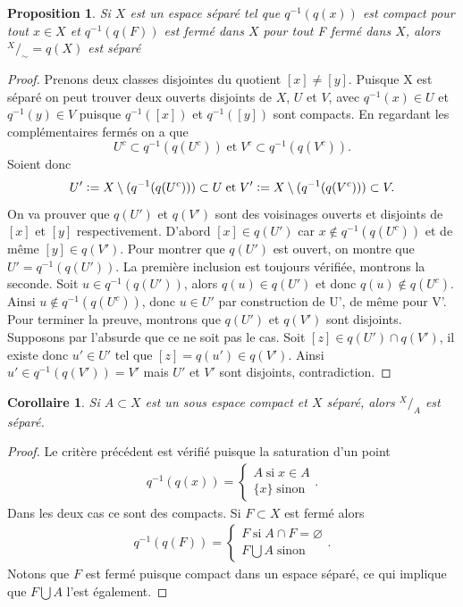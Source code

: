 \documentclass[12pt]{book}
\newcommand{\defeq}{\vcentcolon=}
\newtheorem{cor}[lemma]{Corollaire}
\newtheorem{prop}[lemma]{Proposition}
\theoremstyle{definition}
\theoremstyle{remark}
\newcommand*\quot[2]{{^{\textstyle #1}\big/_{\textstyle #2}}}
\begin{document}
	\begin{prop}
		Si $X$ est un espace séparé tel que $q^{-1}(q(x))$ est compact pour tout  $x\in X$ et $q^{-1}(q(F))$ est fermé dans $X$ pour tout F fermé dans $X$, alors $\quot{X}{\sim} = q(X)$ est séparé
	\end{prop}
	\begin{proof}
		Prenons deux classes disjointes du quotient $[x] \neq [y]$. Puisque X est séparé on peut trouver deux ouverts disjoints de $X$, $U$ et $V$, avec $q^{-1}(x) \in U$ et  $q^{-1}(y) \in V$ puisque $q^{-1}([x])$ et  $q^{-1}([y])$ sont compacts. En regardant les complémentaires fermés on a que \[
			U^c \subset q^{-1}(q(U^c)) \; \text{et} \; V^c \subset q^{-1}(q(V^c))
		.\] Soient donc \[
		U' \defeq X\setminus(q^{-1}(q(U^c))) \subset U \; \text{et} \; V' \defeq X\setminus(q^{-1}(q(V^c))) \subset V
	.\]  On va prouver que $q(U')$ et  $q(V')$ sont des voisinages ouverts et disjoints de $[x]$ et $[y]$ respectivement. 
	D'abord $[x] \in q(U')$ car  $x \not\in q^{-1}(q(U^c))$ et de même  $[y] \in q(V')$. Pour montrer que $q(U')$ est ouvert, on montre que  $U' = q^{-1}(q(U'))$. La première inclusion est toujours vérifiée, montrons la seconde. Soit $u \in q^{-1}(q(U'))$, alors $q(u) \in q(U')$ et donc $q(u) \not\in q(U^c)$. Ainsi  $u \not\in q^{-1}(q(U^c))$, donc $u \in U'$ par construction de U', de même pour V'. \\
	Pour terminer la preuve, montrons que $q(U')$ et  $q(V')$ sont disjoints. Supposons par l'absurde que ce ne soit pas le cas. Soit $[z] \in q(U')\cap q(V')$, il existe donc $u' \in U'$ tel que  $[z] = q(u') \in q(V')$. Ainsi $u' \in q^{-1}(q(V')) = V'$ mais  $U'$ et  $V'$ sont disjoints, contradiction.
	\end{proof}
	\begin{cor}
		Si $A \subset X$ est un sous espace compact et $X$ séparé, alors $\quot{X}{A}$ est séparé.
	\end{cor}
	\begin{proof}
		Le critère précédent est vérifié puisque la saturation d'un point
		\begin{align*}
			q^{-1}(q(x)) = \begin{cases}
				A \; \text{si} \; x \in A \\
				\{x\} \; \text{sinon} 
			\end{cases}
		.\end{align*} Dans les deux cas ce sont des compacts.
		Si $F \subset X$ est fermé alors 
		\begin{align*}
			q^{-1}(q(F)) = \begin{cases}
				F \; \text{si} \; A\cap F = \varnothing \\
				F \bigcup A \; \text{sinon}
			\end{cases}
		.\end{align*} Notons que $F$ est fermé puisque compact dans un espace séparé, ce qui implique que  $F \bigcup A$ l'est également.
	\end{proof}
\end{document}
